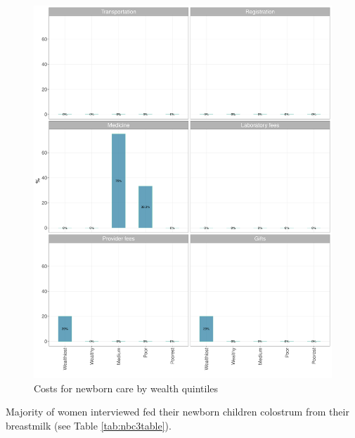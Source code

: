 \documentclass[12pt,a4paper]{article}
\begin{document}
\begin{figure}[H]

{\centering \includegraphics{kayahReport_files/figure-latex/nbc6Plot-1} 

}

\caption{Costs for newborn care by wealth quintiles}\label{fig:nbc6Plot}
\end{figure}

\newpage

Majority of women interviewed fed their newborn children colostrum from their breastmilk (see Table \ref{tab:nbc3table}).
\end{document}
